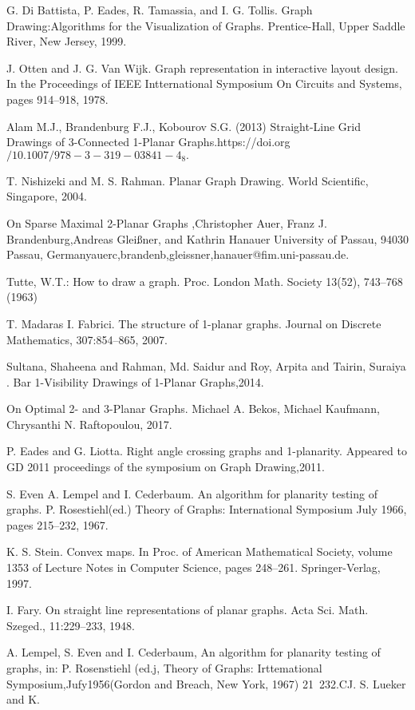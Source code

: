 \begin{thebibliography}{9}
G. Di Battista, P. Eades, R. Tamassia, and I. G. Tollis. Graph Drawing:Algorithms for the Visualization of Graphs. Prentice-Hall, Upper Saddle River, New Jersey, 1999.



J. Otten and J. G. Van Wijk. Graph representation in interactive layout design. In the Proceedings of IEEE Intternational Symposium On Circuits and Systems, pages 914–918, 1978.





Alam M.J., Brandenburg F.J., Kobourov S.G. (2013) Straight-Line Grid Drawings of 3-Connected 1-Planar Graphs.https://doi.org$/10.1007/978-3-319-03841-4_8.$




T. Nishizeki and M. S. Rahman. Planar Graph Drawing. World Scientific, Singapore, 2004.




On Sparse Maximal 2-Planar Graphs ,Christopher Auer, Franz J. Brandenburg,Andreas Gleißner, and Kathrin Hanauer University of Passau, 94030 Passau, Germany{auerc,brandenb,gleissner,hanauer}@fim.uni-passau.de.



{Tutte, W.T.: How to draw a graph. Proc. London Math. Society 13(52), 743–768 (1963)}




T. Madaras I. Fabrici. The structure of 1-planar graphs. Journal on Discrete Mathematics, 307:854–865, 2007.



Sultana, Shaheena and Rahman, Md. Saidur and Roy, Arpita and Tairin, Suraiya . Bar 1-Visibility Drawings of 1-Planar Graphs,2014.


On Optimal 2- and 3-Planar Graphs. Michael A. Bekos, Michael Kaufmann, Chrysanthi N. Raftopoulou, 2017.


P. Eades and G. Liotta. Right angle crossing graphs and 1-planarity. Appeared to GD 2011 proceedings of the symposium on Graph Drawing,2011.



S. Even A. Lempel and I. Cederbaum. An algorithm for planarity testing of graphs. P. Rosestiehl(ed.) Theory of Graphs: International Symposium July 1966, pages 215–232, 1967.


K. S. Stein. Convex maps. In Proc. of American Mathematical Society, volume 1353 of Lecture Notes in Computer Science, pages 248–261. Springer-Verlag, 1997.



I. Fary. On straight line representations of planar graphs. Acta Sci. Math. Szeged., 11:229–233, 1948.



A. Lempel, S. Even and I. Cederbaum, An algorithm for planarity testing of graphs, in: P. 
Rosenstiehl (ed.j, Theory of Graphs: Irttemational Symposium,Jufy1956(Gordon and Breach, New York, 1967)  21~232.CJ. S. Lueker and  K.


\end{thebibliography}
\endinput
